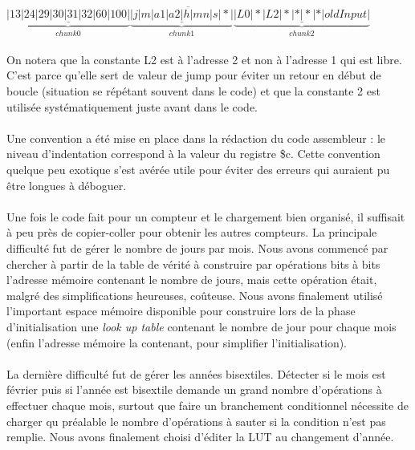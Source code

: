 \documentclass{article}
\begin{document}
\paragraph{}$\overline{\underbrace{\underline{|13|24|29|30|31|32|60|100|}}_{chunk 0}\underbrace{\underline{|j|m|a1|a2|h|mn|s|*|}}_{chunk 1}\underbrace{\underline{|L0|*|L2|*|*|*|*|oldInput|}}_{chunk 2}}$

\paragraph{}On notera que la constante L2 est à l'adresse 2 et non à l'adresse 1 qui est libre. C'est parce qu'elle sert de valeur de jump pour éviter un retour en début de boucle (situation se répétant souvent dans le code) et que la constante 2 est utilisée systématiquement juste avant dans le code.

\paragraph{}Une convention a été mise en place dans la rédaction du code assembleur : le niveau d'indentation correspond à la valeur du registre \$c. Cette convention quelque peu exotique s'est avérée utile pour éviter des erreurs qui auraient pu être longues à déboguer.

\paragraph{}Une fois le code fait pour un compteur et le chargement bien organisé, il suffisait à peu près de copier-coller pour obtenir les autres compteurs. La principale difficulté fut de gérer le nombre de jours par mois. Nous avons commencé par chercher à partir de la table de vérité à construire par opérations bits à bits l'adresse mémoire contenant le nombre de jours, mais cette opération était, malgré des simplifications heureuses, coûteuse. Nous avons finalement utilisé l'important espace mémoire disponible pour construire lors de la phase d'initialisation une \emph{look up table} contenant le nombre de jour pour chaque mois (enfin l'adresse mémoire la contenant, pour simplifier l'initialisation).

\paragraph{}La dernière difficulté fut de gérer les années bisextiles. Détecter si le mois est février puis si l'année est bisextile demande un grand nombre d'opérations à effectuer chaque mois, surtout que faire un branchement conditionnel nécessite de charger qu préalable le nombre d'opérations à sauter si la condition n'est pas remplie. Nous avons finalement choisi d'éditer la LUT au changement d'année.
\end{document}
